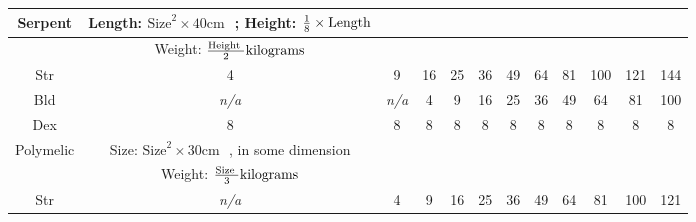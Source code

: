 \documentclass[twoside]{book}
\begin{document}
\begin{table}[htb]
\begin{center}
\begin{tabular}{|c|c|c|c|c|c|c|c|c|c|c|c|}
 Serpent &  Length: \begin{math}  
                        {\textrm{Size}}^{ 2 }   \times   40 \textrm{cm
                          }  \end{math} ; Height: \begin{math} 
                           {{ 1 }\over{ 8 }}  
                           \times  \textrm{Length}  \end{math}
                  \\

\hline

& Weight: \begin{math}  {{\textrm{Height
                    }}\over{ 2 }}  \textrm{kilograms} 
                     \end{math}
                  \\

\hline

 Str & 4 & 9 & 16 & 25 & 36 & 49 & 64 & 81 & 100 & 121 & 144 \\

\hline

 Bld &
                    \textit{n/a}
                  &
                    \textit{n/a}
                  & 4 & 9 & 16 & 25 & 36 & 49 & 64 & 81 & 100 \\

\hline

 Dex & 8 & 8 & 8 & 8 & 8 & 8 & 8 & 8 & 8 & 8 & 8 \\

\hline

 Polymelic &  Size: \begin{math}  
                        {\textrm{Size}}^{ 2 }   \times   30 \textrm{cm
                         }  \end{math} , in some dimension
                  \\

\hline

& Weight: \begin{math}  {{\textrm{Size
                    }}\over{ 3 }}  \textrm{kilograms} 
                     \end{math}
                  \\

\hline

 Str &
                    \textit{n/a}
                  & 4 & 9 & 16 & 25 & 36 & 49 & 64 & 81 & 100 & 121 \\

\hline


\end{tabular}
\end{center}
\end{table}
\end{document}
